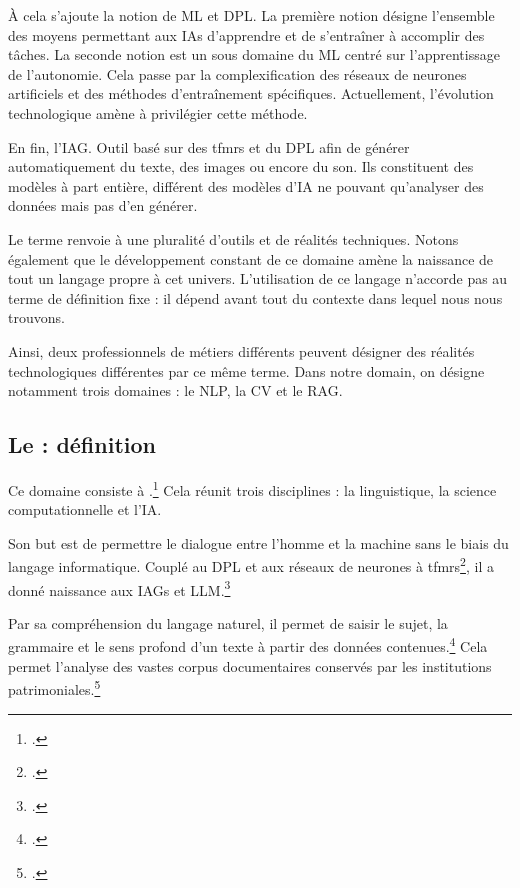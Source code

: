 À cela s'ajoute la notion de \gls{ML} et \gls{DPL}. La première notion désigne l'ensemble des moyens permettant aux \glspl{IA} d'apprendre et de s'entraîner à accomplir des tâches. La seconde notion est un sous domaine du \gls{ML} centré sur l'apprentissage de l'autonomie. Cela passe par la complexification des réseaux de neurones artificiels et des méthodes d'entraînement spécifiques. Actuellement, l'évolution technologique amène à privilégier cette méthode. 

En fin, l'\gls{IAG}. Outil basé sur des \gls{tfmrs} et du \gls{DPL} afin de générer automatiquement du texte, des images ou encore du son. Ils constituent des modèles à part entière, différent des modèles d'\gls{IA} ne pouvant qu'analyser des données mais pas d'en générer. \newline

Le terme  renvoie à une pluralité d'outils et de réalités techniques. Notons également que le développement constant de ce domaine amène la naissance de tout un langage propre à cet univers. L'utilisation de ce langage n'accorde pas au terme  de définition fixe : il dépend avant tout du contexte dans lequel nous nous trouvons. 

Ainsi, deux professionnels de métiers différents peuvent désigner des réalités technologiques différentes par ce même terme. Dans notre domain, on désigne notamment trois domaines : le \gls{NLP}, la \gls{CV} et le \gls{RAG}.

\subsection{Le  : définition}
\label{nlp}

Ce domaine consiste à .\footcite{NLPQuestCe} Cela réunit trois disciplines : la linguistique, la science computationnelle et l'\gls{IA}. 

Son but est de permettre le dialogue entre l'homme et la machine sans le biais du langage informatique. Couplé au \gls{DPL} et aux réseaux de neurones à \gls{tfmrs}\footcite{devlinBERTPretrainingDeep2019}, il a donné naissance aux \glspl{IAG} et \gls{LLM}.\footcite{holdsworthQuestCeQue2024}

Par sa compréhension du langage naturel, il permet de saisir le sujet, la grammaire et le sens profond d'un texte à partir des données contenues.\footcite{holdsworthQuestCeQue2024} Cela permet l'analyse des vastes corpus documentaires conservés par les institutions patrimoniales.\footcite{poibeauTraitementAutomatiqueLangues2014}

